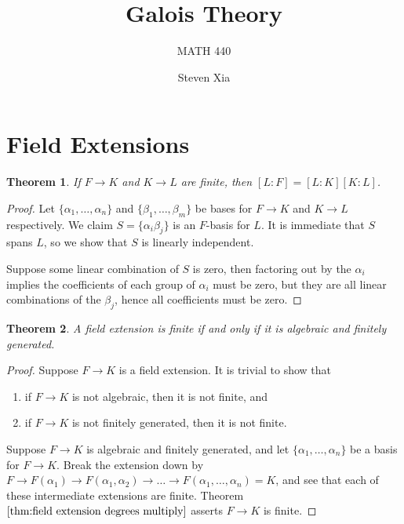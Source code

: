 \documentclass[
    parskip=half,
    toc=flat,
    toc=sectionentrydotfill,
]{scrartcl}  %
\title{Galois Theory}
\subtitle{MATH 440}
\author{Steven Xia}
\theoremstyle{definition}
\theoremstyle{plain}
\newtheorem{theorem}{Theorem}[section]
\theoremstyle{remark}
\begin{document}
\maketitle

\begin{quote} 
\end{quote}

\tableofcontents


\section{Field Extensions}

\begin{theorem}
    \label{thm:field extension degrees multiply}
    If $F\to K$ and $K\to L$ are finite, then $[L:F]=[L:K][K:L]$.
\end{theorem}

\begin{proof}
    Let $\{\alpha_1,\dots,\alpha_n\}$ and $\{\beta_1,\dots,\beta_m\}$ be bases for $F\to K$ and $K\to L$
    respectively.
    We claim $S=\{\alpha_i\beta_j\}$ is an $F$-basis for $L$.
    It is immediate that $S$ spans $L$, so we show that $S$ is linearly independent.

    Suppose some linear combination of $S$ is zero, then factoring out by the $\alpha_i$ implies the coefficients of
    each group of $\alpha_i$ must be zero, but they are all linear combinations of the $\beta_j$, hence all
    coefficients must be zero.
\end{proof}

\begin{theorem}
    A field extension is finite if and only if it is algebraic and finitely generated.
\end{theorem}

\begin{proof}
    Suppose $F\to K$ is a field extension.
    It is trivial to show that
    \begin{enumerate}
        \item if $F\to K$ is not algebraic, then it is not finite, and
        \item if $F\to K$ is not finitely generated, then it is not finite.
    \end{enumerate}

    Suppose $F\to K$ is algebraic and finitely generated, and let $\{\alpha_1,\dots,\alpha_n\}$ be a basis for
    $F\to K$.
    Break the extension down by $F\to F(\alpha_1)\to F(\alpha_1,\alpha_2)\to\dots\to F(\alpha_1,\dots,\alpha_n)=K$, and
    see that each of these intermediate extensions are finite.
    Theorem $\ref{thm:field extension degrees multiply}$ asserts $F\to K$ is finite.
\end{proof}
\end{document}
